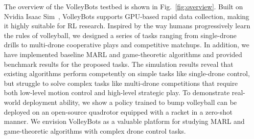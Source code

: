 The overview of the VolleyBots testbed is shown in Fig.~\ref{fig:overview}.
Built on Nvidia Isaac Sim~\cite{Mittal_2023}, VolleyBots supports GPU-based rapid data collection, making it highly suitable for RL research. Inspired by the way humans progressively learn the rules of volleyball, we designed a series of tasks ranging from single-drone drills to multi-drone cooperative plays and competitive matchups. In addition, we have implemented baseline MARL and game-theoretic algorithms and provided benchmark results for the proposed tasks. 
The simulation results reveal that existing algorithms perform competently on simple tasks like single-drone control, but struggle to solve complex tasks like multi-drone competitions that require both low-level motion control and high-level strategic play.
To demonstrate real-world deployment ability, we show a policy trained to bump volleyball can be deployed on an open-source quadrotor equipped with a racket in a zero-shot manner. We envision VolleyBots as a valuable platform for studying MARL and game-theoretic algorithms with complex drone control tasks.



